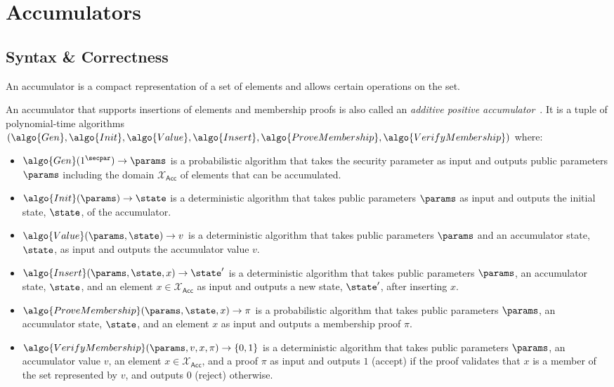 \section{Accumulators}\label{sec:accumulators}

\subsection{Syntax \& Correctness}

An accumulator is a compact representation of a set of elements and allows certain operations on the set.

\begin{definition}[Accumulator]\label{def:accumulator}
An accumulator that supports insertions of elements and membership proofs is also called an \emph{additive positive accumulator}~\cite{RSA:BalCanYak20}.
It is a tuple of polynomial-time algorithms $(\algo{Gen}, \algo{Init}, \algo{Value}, \algo{Insert}, \algo{ProveMembership}, \algo{VerifyMembership})$ where:

\begin{itemize}
    \item $\algo{Gen}(1^\secpar) \rightarrow \params$ is a probabilistic algorithm that takes the security parameter as input and outputs public parameters $\params$ including the domain $\mathcal{X}_\mathsf{Acc}$ of elements that can be accumulated.
    \item $\algo{Init}(\params) \rightarrow \state$ is a deterministic algorithm that takes public parameters $\params$ as input and outputs the initial state, $\state$, of the accumulator.
    \item $\algo{Value}(\params, \state) \rightarrow v$ is a deterministic algorithm that takes public parameters $\params$ and an accumulator state, $\state$, as input and outputs the accumulator value $v$.
    \item $\algo{Insert}(\params, \state, x) \rightarrow \state'$ is a deterministic algorithm that takes public parameters $\params$, an accumulator state, $\state$, and an element $x \in \mathcal{X}_\mathsf{Acc}$ as input and outputs a new state, $\state'$, after inserting $x$.
    \item $\algo{ProveMembership}(\params, \state, x) \rightarrow \pi$ is a probabilistic algorithm that takes public parameters $\params$, an accumulator state, $\state$, and an element $x$ as input and outputs a membership proof $\pi$.
    \item $\algo{VerifyMembership}(\params, v, x, \pi) \rightarrow \{0, 1\}$ is a deterministic algorithm that takes public parameters $\params$, an accumulator value $v$, an element $x \in \mathcal{X}_\mathsf{Acc}$, and a proof $\pi$ as input and outputs $1$ (accept) if the proof validates that $x$ is a member of the set represented by $v$, and outputs $0$ (reject) otherwise.
\end{itemize}
\end{definition}

